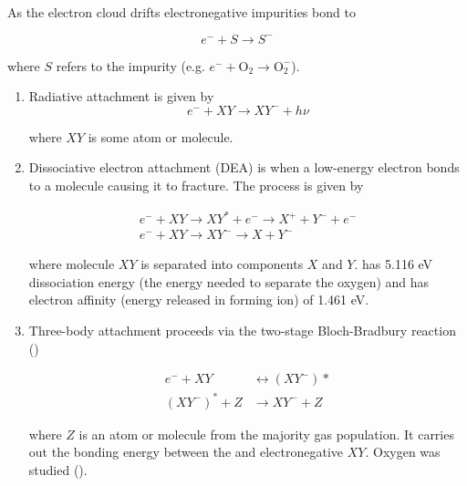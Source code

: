 As the electron cloud drifts electronegative impurities bond to \electron

\begin{equation}
e^{-} + S \rightarrow S^{-}
\label{eq:impurity_attach}
\end{equation}

\noindent where $S$ refers to the impurity (e.g. $e^- + \mathrm{O_2} \rightarrow \mathrm{O_2^-}$).

\begin{enumerate}
\item Radiative attachment is given by
\begin{equation}
e^- + XY \rightarrow XY^- + h \nu
\end{equation}

\noindent where $XY$ is some atom or molecule.

\item Dissociative electron attachment (DEA) is when a low-energy electron bonds to a molecule causing it to fracture.  The process
is given by

\begin{equation}
\begin{aligned}
e^- + XY \rightarrow XY^* + e^- \rightarrow X^+ + Y^- + e^- \\
e^- + XY \rightarrow XY^- \rightarrow X + Y^-
\end{aligned}
\end{equation}

\noindent where molecule $XY$ is separated into components $X$ and $Y$.   has 5.116 eV dissociation energy (the energy needed to
separate the oxygen) and  has electron affinity (energy released in forming ion) of 1.461 eV.

\item Three-body attachment proceeds via the two-stage Bloch-Bradbury reaction ()

\begin{equation}
\begin{aligned}
e^- + XY &\leftrightarrow (XY^-)* \\
(XY^-)^* + Z &\rightarrow XY^- + Z
\end{aligned}
\end{equation}

\noindent where $Z$ is an atom or molecule from the majority gas population.  It carries out the bonding energy between the
\electron and electronegative $XY$.  Oxygen was studied ().
\end{enumerate}



